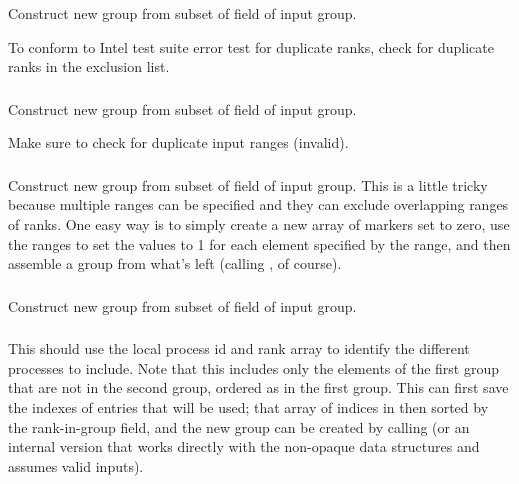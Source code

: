 \documentclass{article}
\begin{document}
\subsubsection{}
\begin{adi3}
  Construct new group from subset of  field of
  input group.

  To conform to Intel test suite error test for duplicate ranks, check for 
  duplicate ranks in the exclusion list.
\end{adi3}

\subsubsection{}
\begin{adi3}
  Construct new group from subset of  field of
  input group.

  Make sure to check for duplicate input ranges (invalid).
\end{adi3}

\subsubsection{}
\begin{adi3}
  Construct new group from subset of  field of
  input group.  This is a little tricky because multiple ranges can be
  specified and they can exclude overlapping ranges of ranks.  One easy way is
  to simply create a new array of markers set to zero, use the ranges to set
  the values to 1 for each element specified by the range, and then assemble
  a group from what's left (calling , of course).
\end{adi3}

\subsubsection{}
\begin{adi3}
  Construct new group from subset of  field of
  input group.
\end{adi3}

\subsubsection{}

This should use the local process id and rank array to identify the different
processes to include.  Note that this includes only the elements of the first
group that are not in the second group, ordered as in the first group.  
This can first save the indexes of entries that will be used; that array of
indices in then sorted by the rank-in-group field, and the new group can be
created by calling  (or an internal version that works
directly with the non-opaque data structures and assumes valid inputs).
\end{document}
